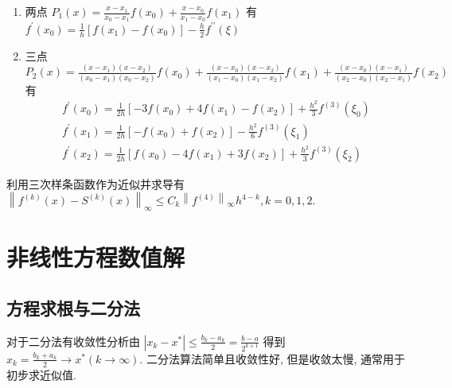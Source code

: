 \documentclass[10pt]{yerbaformat}
\begin{document}
\begin{enumerate}
    \item 两点 $P_{1}(x)=\frac{x-x_{1}}{x_{0}-x_{1}} f\left(x_{0}\right)+\frac{x-x_{0}}{x_{1}-x_{0}} f\left(x_{1}\right)$ 有 $f^{\prime}\left(x_{0}\right)=\frac{1}{h}\left[f\left(x_{1}\right)-f\left(x_{0}\right)\right]-\frac{h}{2} f^{\prime \prime}(\xi)$
    \item 三点 $P_{2}(x)=\frac{\left(x-x_{1}\right)\left(x-x_{2}\right)}{\left(x_{0}-x_{1}\right)\left(x_{0}-x_{2}\right)} f\left(x_{0}\right)+\frac{\left(x-x_{0}\right)\left(x-x_{2}\right)}{\left(x_{1}-x_{0}\right)\left(x_{1}-x_{2}\right)} f\left(x_{1}\right)+\frac{\left(x-x_{0}\right)\left(x-x_{1}\right)}{\left(x_{2}-x_{0}\right)\left(x_{2}-x_{1}\right)} f\left(x_{2}\right)$ 有
          $$
              \begin{array}{l}
                  f^{\prime}\left(x_{0}\right)=\frac{1}{2 h}\left[-3 f\left(x_{0}\right)+4 f\left(x_{1}\right)-f\left(x_{2}\right)\right]+\frac{h^{2}}{3} f^{(3)}\left(\xi_{0}\right) \\
                  f^{\prime}\left(x_{1}\right)=\frac{1}{2 h}\left[-f\left(x_{0}\right)+f\left(x_{2}\right)\right]-\frac{h^{2}}{6} f^{(3)}\left(\xi_{1}\right)                         \\
                  f^{\prime}\left(x_{2}\right)=\frac{1}{2 h}\left[f\left(x_{0}\right)-4 f\left(x_{1}\right)+3 f\left(x_{2}\right)\right]+\frac{h^{2}}{3} f^{(3)}\left(\xi_{2}\right)
              \end{array}
          $$
\end{enumerate}

\par 利用三次样条函数作为近似并求导有 $\left\|f^{(k)}(x)-S^{(k)}(x)\right\|_{\infty} \leq C_{k}\left\|f^{(4)}\right\|_{\infty} h^{4-k}, k=0,1,2$.

\section{非线性方程数值解}
\subsection{方程求根与二分法}

\par 对于二分法有收敛性分析由 $\left|x_{k}-x^{*}\right| \leq \frac{b_{k}-a_{k}}{2}=\frac{b-a}{2^{k+1}}$ 得到 $x_{k}=\frac{b_{k}+a_{k}}{2} \rightarrow x^{*}(k \rightarrow \infty)$. 二分法算法简单且收敛性好, 但是收敛太慢, 通常用于初步求近似值.
\end{document}
